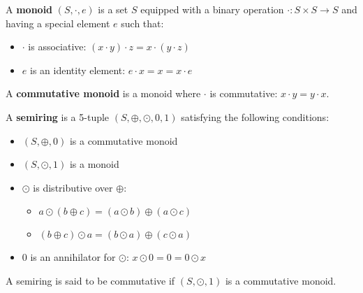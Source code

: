 
\begin{definition}[Monoid]
    A \textbf{monoid} $(S, \cdot, e)$ is a set $S$ equipped with a binary operation $\cdot : S \times S \rightarrow S$ and having a special element $e$ such that:
    \begin{itemize}
        \item {$\cdot$ is associative:} $ (x \cdot y) \cdot z = x \cdot (y \cdot z)$
        \item {$e$ is an identity element:} $  e \cdot x = x = x \cdot e$
    \end{itemize}
    A \textbf{commutative monoid} is a monoid where $\cdot$ is commutative: $x \cdot y = y \cdot x$.
\end{definition}

\begin{definition}[Semiring]
    \label{def_semiring}
        A \textbf{semiring} is a 5-tuple $(S,\oplus,\odot,0,1)$ satisfying the following conditions:
         \begin{itemize}
            \item {$(S,\oplus,0)$ is a commutative monoid} 
            \item {$(S,\odot,1)$ is a monoid} 
            \item {$\odot$ is distributive over $\oplus$:}
            \begin{itemize}
                \item $a \odot ( b \oplus c) = (a \odot b) \oplus (a \odot c)$ 
                \item $(b \oplus c) \odot a = (b \odot a) \oplus (c \odot a)$
            \end{itemize} 
            \item {0 is an annihilator for $\odot$:} $x \odot 0= 0 =  0 \odot x $
        \end{itemize}
        A semiring is said to be commutative if $(S,\odot,1)$ is a commutative monoid.
\end{definition}

